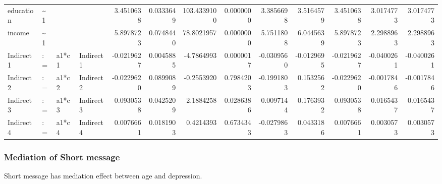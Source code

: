 \documentclass[
]{article}
\begin{document}
\begin{table}[!h]
\begin{tabular}[t]{llllrrrrrrrrr}
\addlinespace
education & \textasciitilde{}1 &  &  & 3.4510638 & 0.0333649 & 103.4339100 & 0.0000000 & 3.3856698 & 3.5164579 & 3.4510638 & 3.0174773 & 3.0174773\\
income & \textasciitilde{}1 &  &  & 5.8978723 & 0.0748440 & 78.8021957 & 0.0000000 & 5.7511808 & 6.0445639 & 5.8978723 & 2.2988963 & 2.2988963\\
Indirect1 & := & a1*c1 & Indirect1 & -0.0219627 & 0.0045885 & -4.7864993 & 0.0000017 & -0.0309560 & -0.0129695 & -0.0219627 & -0.0400261 & -0.0400261\\
Indirect2 & := & a1*c2 & Indirect2 & -0.0229620 & 0.0899089 & -0.2553920 & 0.7984203 & -0.1991803 & 0.1532562 & -0.0229620 & -0.0017846 & -0.0017846\\
Indirect3 & := & a1*c3 & Indirect3 & 0.0930538 & 0.0425209 & 2.1884258 & 0.0286386 & 0.0097144 & 0.1763932 & 0.0930538 & 0.0165437 & 0.0165437\\
\addlinespace
Indirect4 & := & a1*c4 & Indirect4 & 0.0076661 & 0.0181903 & 0.4214393 & 0.6734343 & -0.0279863 & 0.0433186 & 0.0076661 & 0.0030573 & 0.0030573\\
\bottomrule
\end{tabular}
\end{table}

\newpage

\hypertarget{mediation-of-short-message}{%
\subsubsection{Mediation of Short
message}\label{mediation-of-short-message}}

Short message has mediation effect between age and depression.
\end{document}
